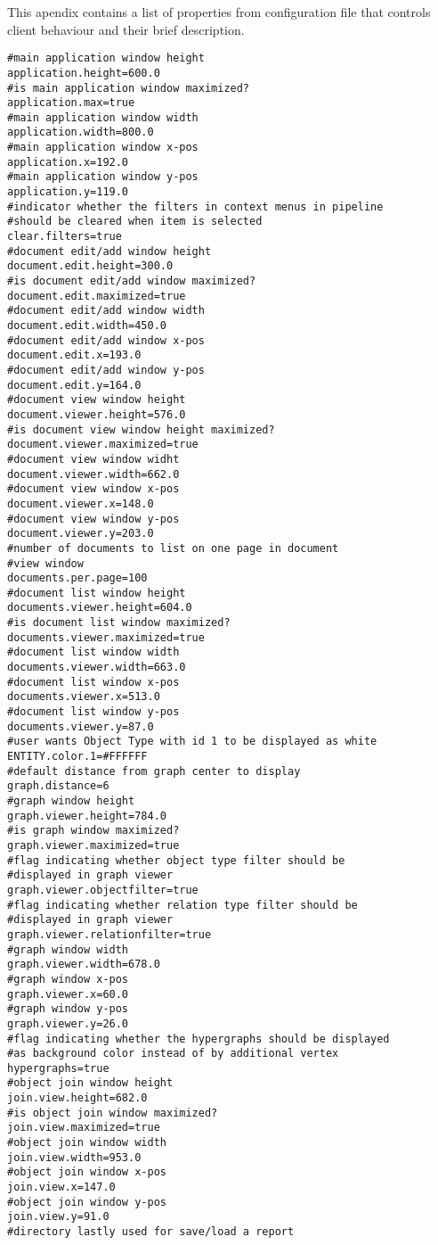 This apendix contains a list of properties from configuration file that controls
client behaviour and their brief description.

\begin{lstlisting}[frame=single,language=properties]
#main application window height
application.height=600.0
#is main application window maximized?
application.max=true
#main application window width
application.width=800.0
#main application window x-pos
application.x=192.0
#main application window y-pos
application.y=119.0
#indicator whether the filters in context menus in pipeline
#should be cleared when item is selected
clear.filters=true
#document edit/add window height
document.edit.height=300.0
#is document edit/add window maximized?
document.edit.maximized=true
#document edit/add window width
document.edit.width=450.0
#document edit/add window x-pos
document.edit.x=193.0
#document edit/add window y-pos
document.edit.y=164.0
#document view window height
document.viewer.height=576.0
#is document view window height maximized?
document.viewer.maximized=true
#document view window widht
document.viewer.width=662.0
#document view window x-pos
document.viewer.x=148.0
#document view window y-pos
document.viewer.y=203.0
#number of documents to list on one page in document
#view window
documents.per.page=100
#document list window height
documents.viewer.height=604.0
#is document list window maximized?
documents.viewer.maximized=true
#document list window width
documents.viewer.width=663.0
#document list window x-pos
documents.viewer.x=513.0
#document list window y-pos
documents.viewer.y=87.0
#user wants Object Type with id 1 to be displayed as white
ENTITY.color.1=#FFFFFF
#default distance from graph center to display
graph.distance=6
#graph window height
graph.viewer.height=784.0
#is graph window maximized?
graph.viewer.maximized=true
#flag indicating whether object type filter should be
#displayed in graph viewer
graph.viewer.objectfilter=true
#flag indicating whether relation type filter should be
#displayed in graph viewer
graph.viewer.relationfilter=true
#graph window width
graph.viewer.width=678.0
#graph window x-pos
graph.viewer.x=60.0
#graph window y-pos
graph.viewer.y=26.0
#flag indicating whether the hypergraphs should be displayed
#as background color instead of by additional vertex
hypergraphs=true
#object join window height
join.view.height=682.0
#is object join window maximized?
join.view.maximized=true
#object join window width
join.view.width=953.0
#object join window x-pos
join.view.x=147.0
#object join window y-pos
join.view.y=91.0
#directory lastly used for save/load a report

\end{lstlisting}
